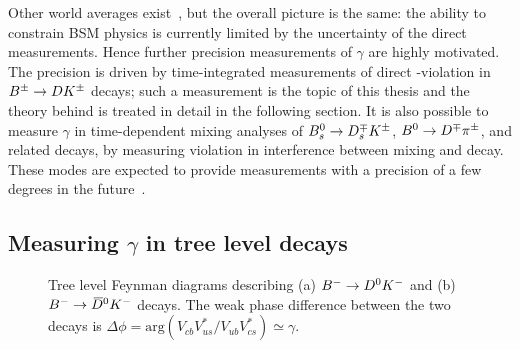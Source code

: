 Other world averages exist~\cite{HFLAV,UTfit-UT}, but the overall picture is the same: the ability to constrain BSM physics is currently limited by the uncertainty of the direct measurements. Hence further precision measurements of $\gamma$ are highly motivated. The precision is driven by time-integrated measurements of direct \CP-violation in ${{B}^\pm}\rightarrow{\ensuremath{D}}{\ensuremath{{K}^\pm}}$ decays; such a measurement is the topic of this thesis and the theory behind is treated in detail in the following section. It is also possible to measure $\gamma$ in time-dependent mixing analyses of ${{B}^0_{s}}\rightarrow{\ensuremath{{D}^{\mp}_{s}}}{\ensuremath{{K}^\pm}}$, ${{B}^0}\rightarrow{\ensuremath{{D}^\mp}}{\ensuremath{{\pi}^\pm}}$, and related decays, by measuring \CP violation in interference between mixing and decay. These modes are expected to provide measurements with a precision of a few degrees in the future~\cite{lhcbcollaborationPhysicsCaseLHCb2019}.





\subsection{\texorpdfstring{Measuring $\gamma$ in tree level decays}{Measuring gamma in tree level decays}} %
\label{sub:_measuring_gamma_in_tree_level_decays}

\begin{figure}[t]
    \centering
        \begin{subfigure}[t]{0.39\textwidth}
        \hspace{0.7cm}
        
        \caption{}
        \end{subfigure}
        \begin{subfigure}[t]{0.39\textwidth}
        \hspace{0.7cm}
        
        \caption{}
        \end{subfigure}
        \caption{Tree level Feynman diagrams describing (a) ${{{{B}^-}}\rightarrow {\ensuremath{{D}^0}} {\ensuremath{{K}^-}}}$ and (b) ${{{{B}^-}}\rightarrow {\ensuremath{{\kern 0.18em\overline{\kern -0.18em D}}{}^0}} {\ensuremath{{K}^-}}}$ decays. The weak phase difference between the two decays is $\Delta\phi = 
\text{arg}\left( {V_{cb}V_{us}^*}/{V_{ub}V_{cs}^*} \right)\simeq\gamma$.}
        \label{fig:feynman_diagrams}
    
\end{figure}

